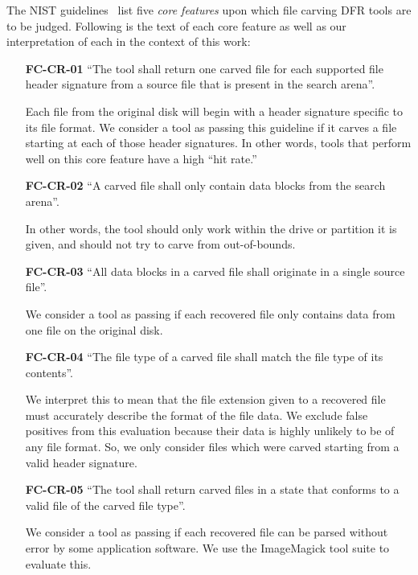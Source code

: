 \begin{paraphrase}
 The NIST guidelines~\cite{carving_standards} list five \emph{core features} upon which file carving DFR tools are to be judged.
Following is the text of each core feature as well as our interpretation of each in the context of this work:
\end{paraphrase}
\begin{itemize}
 \item[\textbf{FC-CR-01}] ``The tool shall return one carved file for each supported file header signature from a source file that is present in the search arena''.~\cite{carving_standards}
 
 Each file from the original disk will begin with a header signature specific to its file format. We consider a tool as passing this guideline if it carves a file starting at each of those header signatures.
 In other words, tools that perform well on this core feature have a high ``hit rate.''
 
 \item[\textbf{FC-CR-02}] ``A carved file shall only contain data blocks from the search arena''.~\cite{carving_standards}
 
 In other words, the tool should only work within the drive or partition it is given, and should not try to carve from out-of-bounds.
 
 \item[\textbf{FC-CR-03}] ``All data blocks in a carved file shall originate in a single source file''.~\cite{carving_standards}
 
We consider a tool as passing if each recovered file only contains data from one file on the original disk.
 
 \item[\textbf{FC-CR-04}] ``The file type of a carved file shall match the file type of its contents''.~\cite{carving_standards}
 
 We interpret this to mean that the file extension given to a recovered file must accurately describe the format of the file data. We exclude false positives from this evaluation because their data is highly unlikely to be of any file format. So, we only consider files which were carved starting from a valid header signature.
 
 \item[\textbf{FC-CR-05}] ``The tool shall return carved files in a state that conforms to a valid file of the carved file type''.~\cite{carving_standards}
 
 We consider a tool as passing if each recovered file can be parsed without error by some application software.
 We use the ImageMagick tool suite to evaluate this.
\end{itemize}
